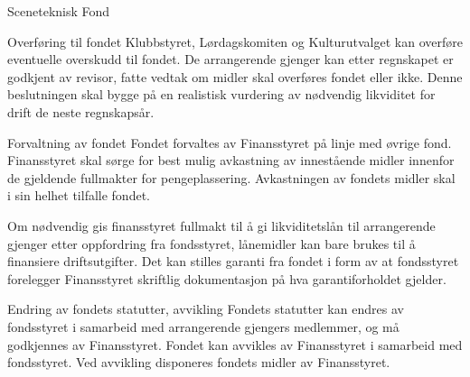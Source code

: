 \begin{fond}{Sceneteknisk Fond}
    \begin{fondsparagraf}{Overføring til fondet}
        Klubbstyret, Lørdagskomiten og Kulturutvalget kan overføre eventuelle overskudd til
        fondet. De arrangerende gjenger
        kan etter regnskapet er godkjent av revisor, fatte vedtak om midler skal overføres fondet
        eller ikke. Denne
        beslutningen skal bygge på en realistisk vurdering av nødvendig likviditet for drift de
        neste regnskapsår.
    \end{fondsparagraf}

    \begin{fondsparagraf}{Forvaltning av fondet}
        Fondet forvaltes av Finansstyret på linje med øvrige fond. Finansstyret skal sørge for
        best mulig avkastning av
        innestående midler innenfor de gjeldende fullmakter for pengeplassering. Avkastningen av
        fondets midler skal i sin
        helhet tilfalle fondet.

        Om nødvendig gis finansstyret fullmakt til å gi likviditetslån til arrangerende gjenger
        etter oppfordring fra fondsstyret,
        lånemidler kan bare brukes til å finansiere driftsutgifter. Det kan stilles garanti fra
        fondet i form av at fondsstyret
        forelegger Finansstyret skriftlig dokumentasjon på hva garantiforholdet gjelder.
    \end{fondsparagraf}

    \begin{fondsparagraf}{Endring av fondets statutter, avvikling}
        Fondets statutter kan endres av fondsstyret i samarbeid med arrangerende gjengers
        medlemmer, og må godkjennes av
        Finansstyret. Fondet kan avvikles av Finansstyret i samarbeid med fondsstyret. Ved
        avvikling disponeres fondets
        midler av Finansstyret.
    \end{fondsparagraf}

\end{fond}

